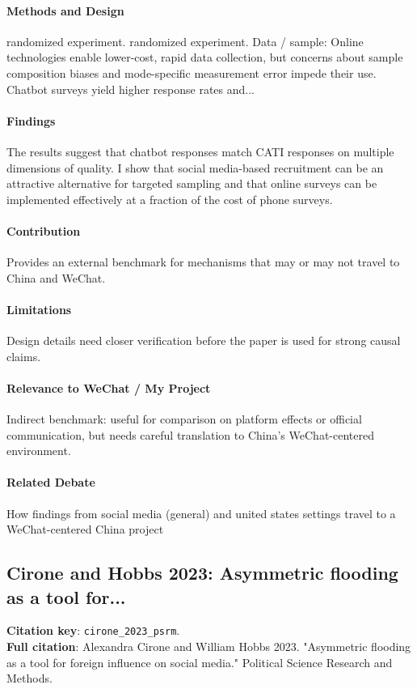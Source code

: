\documentclass[12pt]{article}
\begin{document}
\paragraph{Methods and Design} randomized experiment. randomized experiment. Data / sample: Online technologies enable lower-cost, rapid data collection, but concerns about sample composition biases and mode-specific measurement error impede their use. Chatbot surveys yield higher response rates and...

\paragraph{Findings} The results suggest that chatbot responses match CATI responses on multiple dimensions of quality. I show that social media-based recruitment can be an attractive alternative for targeted sampling and that online surveys can be implemented effectively at a fraction of the cost of phone surveys.

\paragraph{Contribution} Provides an external benchmark for mechanisms that may or may not travel to China and WeChat.

\paragraph{Limitations} Design details need closer verification before the paper is used for strong causal claims.

\paragraph{Relevance to WeChat / My Project} Indirect benchmark: useful for comparison on platform effects or official communication, but needs careful translation to China's WeChat-centered environment.

\paragraph{Related Debate} How findings from social media (general) and united states settings travel to a WeChat-centered China project


\subsection{Cirone and Hobbs 2023: Asymmetric flooding as a tool for...}
\textbf{Citation key}: \texttt{cirone\_2023\_psrm}.\\
\textbf{Full citation}: Alexandra Cirone and William Hobbs 2023. "Asymmetric flooding as a tool for foreign influence on social media." Political Science Research and Methods.
\end{document}
